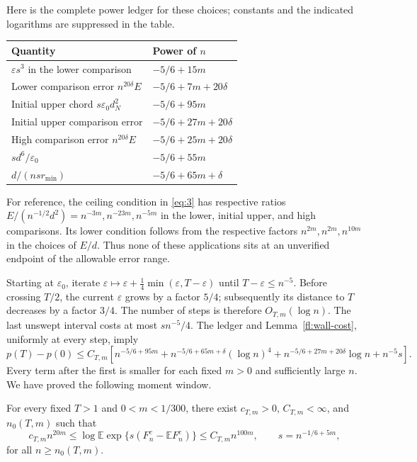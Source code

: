 Here is the complete power ledger for these choices; constants and
the indicated logarithms are suppressed in the table.
\begin{center}
\begin{tabular}{ll}
\toprule
Quantity & Power of $n$\\
\midrule
$\varepsilon s^3$ in the lower comparison & $-5/6+15m$\\
Lower comparison error $n^{20\delta}E$ & $-5/6+7m+20\delta$\\
Initial upper chord $s\varepsilon_0d_N^2$ & $-5/6+95m$\\
Initial upper comparison error & $-5/6+27m+20\delta$\\
High comparison error $n^{20\delta}E$ & $-5/6+25m+20\delta$\\
$sd^6/\varepsilon_0$ & $-5/6+55m$\\
$d/(nsr_{\min})$ & $-5/6+65m+\delta$\\
\bottomrule
\end{tabular}
\end{center}
For reference, the ceiling condition in \eqref{eq:3} has respective
ratios $E/(n^{-1/2}d^2)=n^{-3m},n^{-23m},n^{-5m}$ in the lower,
initial upper, and high comparisons.  Its lower condition follows
from the respective factors $n^{2m},n^{2m},n^{10m}$ in the choices
of $E/d$.  Thus none of these applications sits at an unverified
endpoint of the allowable error range.

Starting at $\varepsilon_0$, iterate
$\varepsilon\mapsto\varepsilon+\frac14\min(\varepsilon,T-\varepsilon)$
until $T-\varepsilon\le n^{-5}$.  Before crossing $T/2$, the current
$\varepsilon$ grows by a factor $5/4$; subsequently its distance to
$T$ decreases by a factor $3/4$.  The number of steps is therefore
$O_{T,m}(\log n)$.  The last unswept interval costs at most $sn^{-5}/4$.
The ledger and Lemma~\ref{fl:wall-cost}, uniformly at every step, imply
\[
 p(T)-p(0)\le C_{T,m}\left[
 n^{-5/6+95m}
 +n^{-5/6+65m+\delta}(\log n)^4
 +n^{-5/6+27m+20\delta}\log n+n^{-5}s\right].
\]
Every term after the first is smaller for each fixed $m>0$ and
sufficiently large $n$.  We have proved the following moment window.

\begin{proposition}\label{fl:laplace-window}
For every fixed $T>1$ and $0<m<1/300$, there exist $c_{T,m}>0$,
$C_{T,m}<\infty$, and $n_0(T,m)$ such that
\[
 c_{T,m}n^{20m}\le
 \log\mathbb E\exp\{s(F_n^c-\mathbb EF_n^c)\}
 \le C_{T,m}n^{100m},\qquad s=n^{-1/6+5m},
\]
for all $n\ge n_0(T,m)$.
\end{proposition}

